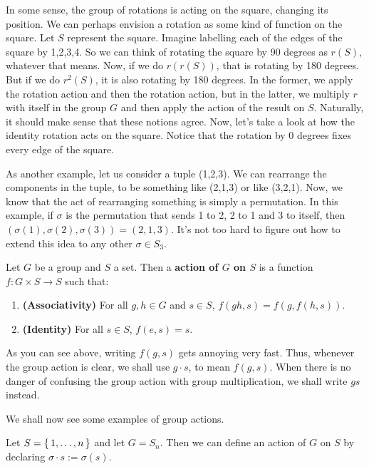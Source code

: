 \documentclass[./main.tex]{subfiles}
\begin{document}
In some sense, the group of rotations is acting on the square, changing its
position. We can perhaps envision a rotation as some kind of function on the
square. Let $S$ represent the square. Imagine labelling each of the edges of the
square by 1,2,3,4. So we can think of rotating the square by 90 degrees as
$r(S)$, whatever that means. Now, if we do $r(r(S))$, that is rotating by 180
degrees. But if we do $r^2 (S)$, it is also rotating by 180 degrees. In the
former, we apply the rotation action and then the rotation action, but in the
latter, we multiply $r$ with itself in the group $G$ and then apply the action
of the result on $S$. Naturally, it should make sense that these notions agree.
Now, let's take a look at how the identity rotation acts on the square. Notice
that the rotation by 0 degrees fixes every edge of the square.

As another example, let us consider a tuple (1,2,3). We can rearrange the
components in the tuple, to be something like (2,1,3) or like (3,2,1). Now, we
know that the act of rearranging something is simply a permutation. In this
example, if $\sigma$ is the permutation that sends 1 to 2, 2 to 1 and 3 to
itself, then $(\sigma(1), \sigma(2), \sigma(3)) = (2,1,3)$. It's not too hard to
figure out how to extend this idea to any other $\sigma \in S_3$.

\begin{definition}
\label{def:group-action}

Let $G$ be a group and $S$ a set. Then a \textbf{action of $G$ on $S$} is a
function $f: G \times S \to S$ such that:
\begin{enumerate}
    \item \textbf{(Associativity)} For all $g, h \in G$ and $s \in S$, $f(gh, s)
    = f(g, f(h,s))$.
    \item \textbf{(Identity)} For all $s \in S$, $f(e,s) = s$.
\end{enumerate}
\end{definition}

As you can see above, writing $f(g,s)$ gets annoying very fast. Thus, whenever
the group action is clear, we shall use $g \cdot s$, to mean $f(g,s)$. When
there is no danger of confusing the group action with group multiplication, we
shall write $gs$ instead.

We shall now see some examples of group actions. 
\begin{example}
    Let $S = \set{1, \dots, n}$ and let $G = S_n$. Then we can define an action
    of $G$ on $S$ by declaring $\sigma \cdot s := \sigma(s)$.
\end{example}
\end{document}
